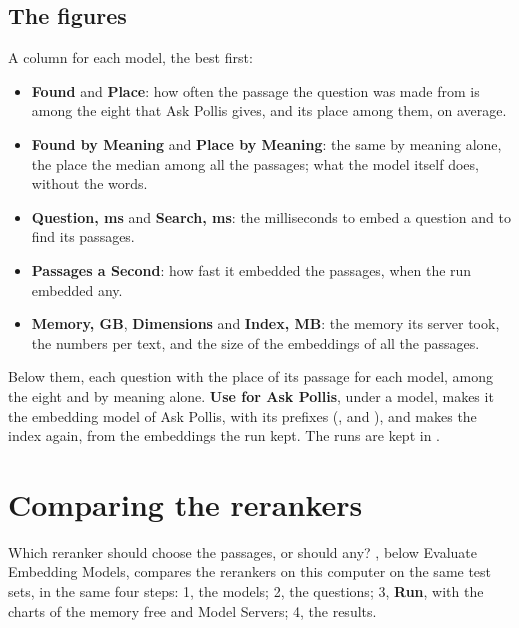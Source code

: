 \subsection{The figures}
A column for each model, the best first:
\begin{itemize}
  \item \textbf{Found} and \textbf{Place}: how often the passage the question was made from is among the eight that Ask
    Pollis gives, and its place among them, on average.
  \item \textbf{Found by Meaning} and \textbf{Place by Meaning}: the same by meaning alone, the place the median among
    all the passages; what the model itself does, without the words.
  \item \textbf{Question, ms} and \textbf{Search, ms}: the milliseconds to embed a question and to find its passages.
  \item \textbf{Passages a Second}: how fast it embedded the passages, when the run embedded any.
  \item \textbf{Memory, GB}, \textbf{Dimensions} and \textbf{Index, MB}: the memory its server took, the numbers per
    text, and the size of the embeddings of all the passages.
\end{itemize}
Below them, each question with the place of its passage for each model, among the eight and by meaning alone.
\textbf{Use for Ask Pollis}, under a model, makes it the embedding model of Ask Pollis, with its prefixes
(,  and ), and makes the
index again, from the embeddings the run kept. The runs are kept in .

\section{Comparing the rerankers}\label{sec:compareRerankers}

Which reranker should choose the passages, or should any? , below Evaluate Embedding Models, compares the rerankers on this computer on the same test sets,
in the same four steps: 1, the models; 2, the questions; 3, \textbf{Run}, with the charts of the memory free and Model
Servers; 4, the results.

